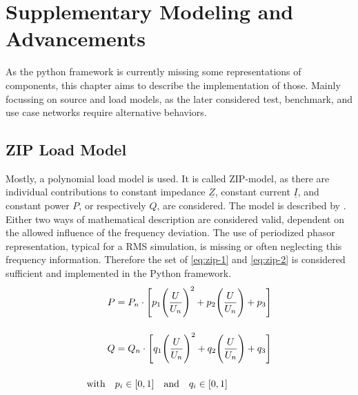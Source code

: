 
\section{Supplementary Modeling and Advancements}

As the python framework is currently missing some representations of components, this chapter aims to describe the implementation of those. Mainly focussing on source and load models, as the later considered test, benchmark, and use case networks require alternative behaviors. 

\subsection{ZIP Load Model}


Mostly, a polynomial load model is used. It is called ZIP-model, as there are individual contributions to constant impedance $\underline{Z}$, constant current $\underline{I}$, and constant power $P$, or respectively $Q$, are considered. The model is described by \textcite{IEEEGuideLoad2022}. Either two ways of mathematical description are considered valid, dependent on the allowed influence of the frequency deviation. The use of periodized phasor representation, typical for a \acs{RMS} simulation, is missing or often neglecting this frequency information. Therefore the set of \autoref{eq:zip-1} and \autoref{eq:zip-2} is considered sufficient and implemented in the Python framework.
\begin{align}
        P&=P_n \cdot \Bigg[ p_1 \Bigg(\frac{U}{U_n}\Bigg)^2 + p_2 \Bigg(\frac{U}{U_n}\Bigg) + p_3 \Bigg] \label{eq:zip-1} \\[12pt]
        Q&=Q_n \cdot \Bigg[ q_1 \Bigg(\frac{U}{U_n}\Bigg)^2 + q_2 \Bigg(\frac{U}{U_n}\Bigg) + q_3 \Bigg] \label{eq:zip-2} \\[12pt]
        \text{with} \quad &p_i \in [0,1] \quad \text{and} \quad q_i \in [0,1] \notag
\end{align}



